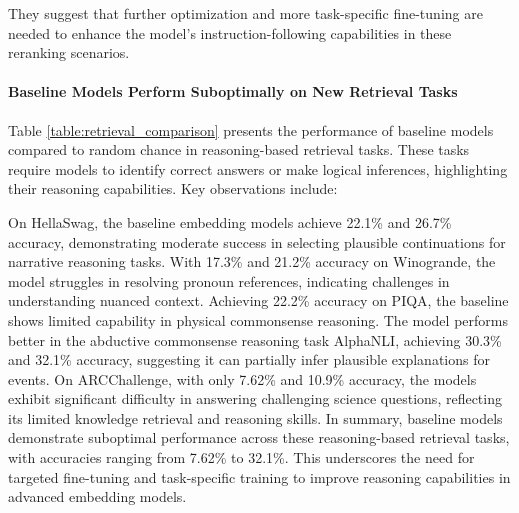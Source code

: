 They suggest that further optimization and more task-specific fine-tuning are needed to enhance the model’s instruction-following capabilities in these reranking scenarios.

\paragraph{Baseline Models Perform Suboptimally on New Retrieval Tasks}

\begin{table}[t!]
\centering
{}
\caption{Results of retrieval tasks for evaluating reasoning.}
\label{table:retrieval_comparison}
\vspace{-1em}
\end{table}

Table \ref{table:retrieval_comparison} presents the performance of baseline models compared to random chance in reasoning-based retrieval tasks. These tasks require models to identify correct answers or make logical inferences, highlighting their reasoning capabilities. Key observations include:

On HellaSwag, the baseline embedding models achieve 22.1\% and 26.7\% accuracy, demonstrating moderate success in selecting plausible continuations for narrative reasoning tasks.
With 17.3\% and 21.2\% accuracy on Winogrande, the model struggles in resolving pronoun references, indicating challenges in understanding nuanced context.
Achieving 22.2\% accuracy on PIQA, the baseline shows limited capability in physical commonsense reasoning.
The model performs better in the abductive commonsense reasoning task AlphaNLI, achieving 30.3\% and 32.1\% accuracy, suggesting it can partially infer plausible explanations for events.
On ARCChallenge, with only 7.62\% and 10.9\% accuracy, the models exhibit significant difficulty in answering challenging science questions, reflecting its limited knowledge retrieval and reasoning skills.
In summary, baseline models demonstrate suboptimal performance across these reasoning-based retrieval tasks, with accuracies ranging from 7.62\% to 32.1\%. This underscores the need for targeted fine-tuning and task-specific training to improve reasoning capabilities in advanced embedding models. 


